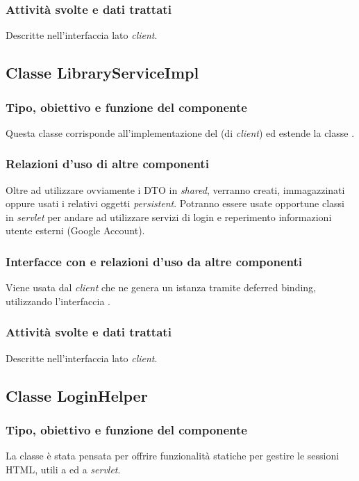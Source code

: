 \subsubsection*{Attivit\`a svolte e dati trattati}
Descritte nell'interfaccia lato \emph{client}.

\subsection{Classe LibraryServiceImpl}
\subsubsection*{Tipo, obiettivo e funzione del componente}
Questa classe corrisponde all'implementazione del  (di
\emph{client}) ed estende la classe .

\subsubsection*{Relazioni d'uso di altre componenti}
Oltre ad utilizzare ovviamente i DTO in \emph{shared}, verranno creati,
immagazzinati oppure usati i relativi oggetti \emph{persistent}.
Potranno essere usate opportune classi in \emph{servlet} per andare ad
utilizzare servizi di login e reperimento informazioni utente esterni (Google
Account).

\subsubsection*{Interfacce con e relazioni d'uso da altre componenti}
Viene usata dal \emph{client} che ne genera un istanza tramite deferred binding,
utilizzando l'interfaccia .

\subsubsection*{Attivit\`a svolte e dati trattati}
Descritte nell'interfaccia lato \emph{client}.

\subsection{Classe LoginHelper}
\subsubsection*{Tipo, obiettivo e funzione del componente}
La classe  \`e stata pensata per offrire funzionalit\`a statiche
per gestire le sessioni HTML, utili a  ed a \emph{servlet}.

